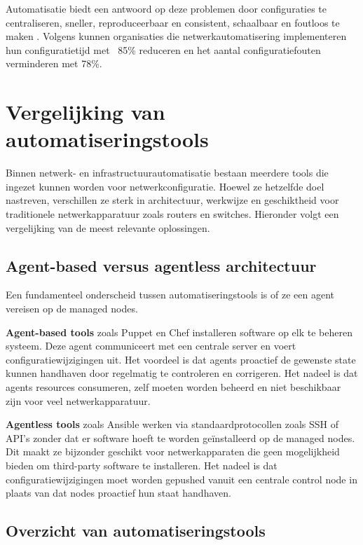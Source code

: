 Automatisatie biedt een antwoord op deze problemen door configuraties te centraliseren, sneller, reproduceerbaar en consistent, schaalbaar en foutloos te maken \autocite{Wagbrant2022}. 
Volgens \textcite{Mahant2024networkautomation} kunnen organisaties die netwerkautomatisering implementeren hun configuratietijd met ~85\% reduceren en het aantal configuratiefouten verminderen met 78\%.

\section{Vergelijking van automatiseringstools}
\label{sec:tools}

Binnen netwerk- en infrastructuurautomatisatie bestaan meerdere tools die ingezet kunnen worden voor netwerkconfiguratie. 
Hoewel ze hetzelfde doel nastreven, verschillen ze sterk in architectuur, werkwijze en geschiktheid voor traditionele netwerkapparatuur zoals routers en switches. 
Hieronder volgt een vergelijking van de meest relevante oplossingen.

\subsection{Agent-based versus agentless architectuur}
\label{subsec:agent-vs-agentless}

Een fundamenteel onderscheid tussen automatiseringstools is of ze een agent vereisen op de managed nodes.

\textbf{Agent-based tools} zoals Puppet en Chef installeren software op elk te beheren systeem. 
Deze agent communiceert met een centrale server en voert configuratiewijzigingen uit.
Het voordeel is dat agents proactief de gewenste state kunnen handhaven door regelmatig te controleren en corrigeren.
Het nadeel is dat agents resources consumeren, zelf moeten worden beheerd en niet beschikbaar zijn voor veel netwerkapparatuur.

\textbf{Agentless tools} zoals Ansible werken via standaardprotocollen zoals SSH of API's zonder dat er software hoeft te worden geïnstalleerd op de managed nodes.
Dit maakt ze bijzonder geschikt voor netwerkapparaten die geen mogelijkheid bieden om third-party software te installeren.
Het nadeel is dat configuratiewijzigingen moet worden gepushed vanuit een centrale control node in plaats van dat nodes proactief hun staat handhaven.

\subsection{Overzicht van automatiseringstools}
\label{subsec:tools-overzicht}

